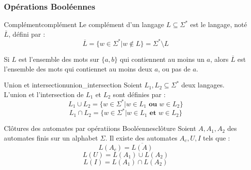 \subsubsection{Opérations Booléennes}
\begin{definition}{Complément}{complément}
    Le complément d'un langage $L\subseteq \Sigma^*$ est le langage, noté $\overline{L}$, défini par :
    \begin{equation*}
        \overline{L} = \{w\in \Sigma^*|w\notin L\} = \Sigma^* \setminus L
    \end{equation*}
\end{definition}
\begin{example}
    Si $L$ est l'ensemble des mots sur $\{a,b\}$ qui contiennent au moins un $a$, alors $\overline{L}$ est l'ensemble des
    mots qui contiennet au moins deux $a$, ou pas de $a$.
\end{example}
\begin{definition}{Union et intersection}{union_intersection}
    Soient $L_1, L_2 \subseteq \Sigma^*$ deux langages. L'union et l'intersection de $L_1$ et $L_2$ sont définies par :
    \begin{equation*}
        L_1 \cup L_2 = \{w\in \Sigma^*|w\in L_1 \textbf{ ou } w\in L_2\}
    \end{equation*}
    \begin{equation*}
        L_1 \cap L_2 = \{w\in \Sigma^*|w\in L_1 \textbf{ et } w\in L_2\}
    \end{equation*}
\end{definition}
\begin{theorem}{Clôtures des automates par opératiions Booléennes}{clôture}
    Soient $A,A_1,A_2$ des automates finis sur un alphabet $\Sigma$. Il existe des automates $A_c, U, I$ tels que :
    \begin{equation*}
        L(A_c) = \overline{L(A)}
    \end{equation*}
    \begin{equation*}
        L(U) = L(A_1) \cup L(A_2)
    \end{equation*}
    \begin{equation*}
        L(I) = L(A_1) \cap L(A_2)
    \end{equation*}
\end{theorem}

